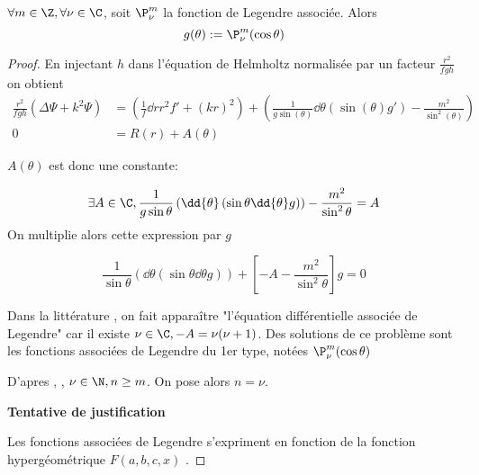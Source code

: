 \begin{prop}$\forall m \in \Z, \forall \nu \in \C$, soit $\P^m_\nu$ la fonction de Legendre associée. Alors
  \begin{equation} 
    g(\theta) := \P^m_\nu(\cos \theta)
  \end{equation}
\end{prop}
\begin{proof}

En injectant $h$ dans l'équation de Helmholtz normalisée par un facteur $\frac{r^2}{fgh}$ on obtient
\begin{align*}
     \frac{r^2}{fgh} \left(\Delta \Psi + k^2 \Psi\right) &= 
     \left(\frac{1}{f}\dd{r}{r^2f'} + (kr)^2\right) + 
     \left(\frac{1}{g\sin(\theta)} \dd{\theta}(\sin(\theta)g') -  \frac{m^2}{\sin^2(\theta)}\right) \\
 0 &= R(r) + A(\theta)
\end{align*}

$A(\theta)$ est donc une constante:

\[
 \exists A \in \C, \frac{1}{g\sin\theta}\left(\dd{\theta}\left(\sin\theta\dd{\theta}g\right)\right)  -\frac{m^2}{\sin^2\theta} = A
\]
  On multiplie alors cette expression par $g$

  \begin{equation*}
    \label{eq:helm:legendre}\frac{1}{\sin\theta}\left(\dd{\theta}\left(\sin\theta\dd{\theta}g\right)\right) + \left[- A -\frac{m^2}{\sin^2\theta}\right]g = 0
  \end{equation*}

Dans la littérature \cite{abramowitz_handbook_1964}, on fait apparaître "l'équation différentielle associée de Legendre" car il existe $
\nu \in \C,-A = \nu(\nu + 1)$. Des solutions de ce problème sont les fonctions associées de Legendre du 1er type, notées $\P^m_\nu(\cos \theta)$ 

D'apres \cite[p.~1264]{abramowitz_handbook_1964}, \cite[p.~84]{bohren_absorption_2004}, $\nu \in \N, n\ge m $. On pose alors $n = \nu$.


{ \color{red}
\textbf{Tentative de justification}

Les fonctions associées de Legendre s'expriment en fonction de la fonction hypergéométrique $F(a,b,c,x)$ \cite[p.~332]{abramowitz_handbook_1964}.

}
\end{proof}
